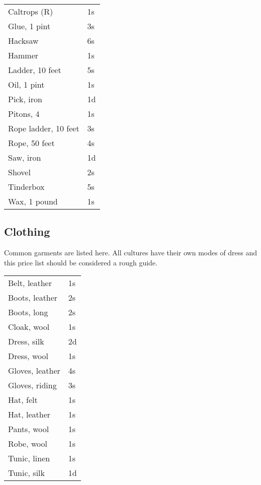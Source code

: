 \begin{center}
{
\begin{xtabular}{|l|l|}
Caltrops (R) & 1s \\
Glue, 1 pint & 3s \\
Hacksaw & 6s \\
Hammer & 1s \\
Ladder, 10 feet & 5s \\
Oil, 1 pint & 1s \\
Pick, iron & 1d \\
Pitons, 4 & 1s \\
Rope ladder, 10 feet & 3s \\
Rope, 50 feet & 4s \\
Saw, iron & 1d \\
Shovel & 2s \\
Tinderbox & 5s \\
Wax, 1 pound & 1s \\
\hline
\end{xtabular}
}
\end{center}

\subsection{Clothing}

Common garments are listed here. All cultures have their own modes of dress and this price list should be considered a rough guide.

\begin{center}
{
\begin{xtabular}{|l|l|}
Belt, leather & 1s \\
Boots, leather & 2s \\
Boots, long & 2s \\
Cloak, wool & 1s \\
Dress, silk & 2d \\
Dress, wool & 1s \\
Gloves, leather & 4s \\
Gloves, riding & 3s \\
Hat, felt & 1s \\
Hat, leather & 1s \\
Pants, wool & 1s \\
Robe, wool & 1s \\
Tunic, linen & 1s \\
Tunic, silk & 1d \\
\hline
\end{xtabular}
}
\end{center}


